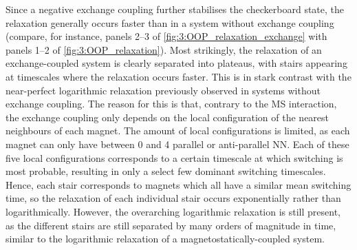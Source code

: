 \vspace{-1em}

Since a negative exchange coupling further stabilises the checkerboard state, the relaxation generally occurs faster than in a system without exchange coupling (compare, for instance, panels 2--3 of \cref{fig:3:OOP_relaxation_exchange} with panels 1--2 of \cref{fig:3:OOP_relaxation}).
Most strikingly, the relaxation of an exchange-coupled system is clearly separated into plateaus, with stairs appearing at timescales where the relaxation occurs faster.
This is in stark contrast with the near-perfect logarithmic relaxation previously observed in systems without exchange coupling.
The reason for this is that, contrary to the MS interaction, the exchange coupling only depends on the local configuration of the nearest neighbours of each magnet.
The amount of local configurations is limited, as each magnet can only have between 0 and 4 parallel or anti-parallel NN.
Each of these five local configurations corresponds to a certain timescale at which switching is most probable, resulting in only a select few dominant switching timescales.
Hence, each stair corresponds to magnets which all have a similar mean switching time, so the relaxation of each individual stair occurs exponentially rather than logarithmically.
However, the overarching logarithmic relaxation is still present, as the different stairs are still separated by many orders of magnitude in time, similar to the logarithmic relaxation of a magnetostatically-coupled system. \\\par

